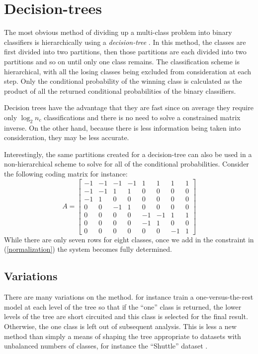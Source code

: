 \documentclass{article}
\newenvironment{eqnnon}{\begin{equation*}}{\end{equation*}}
\begin{document}
\section{Decision-trees}

\label{hierarchical}

The most obvious method of dividing up a multi-class problem into binary
classifiers is hierarchically using a {\it decision-tree} 
\citep{Cheong_etal2004, Lee_Oh2003}.
In this method, the classes are first divided into two partitions, then
those partitions are each divided into two partitions and so on until only
one class remains. The classification scheme is hierarchical, with all the
losing classes being excluded from consideration at each step.
Only the conditional probability of the winning class is calculated as the
product of all the returned conditional probabilities of the binary
classifiers.

Decision trees have the advantage that they are fast since on average they
require only $\log_2 n_c$ classifications and there is no need to solve a 
constrained matrix inverse. On the other hand, because there is less
information being taken into consideration, they may be less
accurate.

Interestingly, the same partitions created for a decision-tree can also
be used in a non-hierarchical scheme
to solve for all of the conditional probabilities. Consider the following
coding matrix for instance:
\begin{eqnnon}
A = 
\begin{bmatrix}
-1 & -1 & -1 & -1 & 1 & 1 & 1 & 1 \\
-1 & -1 & 1 & 1 & 0 & 0 & 0 & 0 \\
-1 & 1 & 0 & 0 & 0 & 0 & 0 & 0 \\
0 & 0 & -1 & 1 & 0 & 0 & 0 & 0 \\
0 & 0 & 0 & 0 & -1 & -1 & 1 & 1 \\
0 & 0 & 0 & 0 & -1 & 1 & 0 & 0 \\
0 & 0 & 0 & 0 & 0 & 0 & -1 & 1
\end{bmatrix}
\end{eqnnon}
While there are only seven rows for eight classes, 
once we add in the constraint in (\ref{normalization}) the system becomes 
fully determined.

\subsection{Variations}

There are many variations on the method. \citet{Ramanan_etal2007} for instance train a 
one-versus-the-rest model at each level of the tree so that if the ``one''
class is returned, the lower levels of the tree are short circuited
and this class is selected for the final result. Otherwise, the one class
is left out of subsequent analysis. This is less a new method than simply
a means of shaping the tree appropriate to datasets with unbalanced
numbers of classes, for instance the ``Shuttle'' dataset \citep{King_etal1995}.
\end{document}
